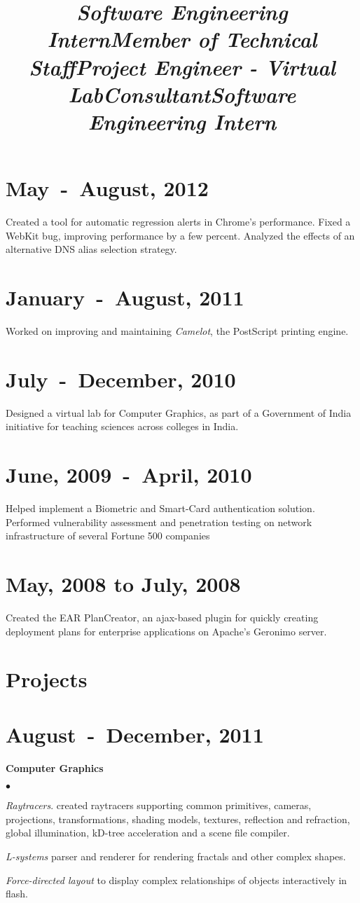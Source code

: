\documentclass[margin,line]{res}
\newcommand{\datesection}[1]{\section{\textnormal{\scriptsize \textcolor{subtle}{#1}}}}
\newenvironment{list2}{
  \begin{list}{$\bullet$}{%
      \setlength{\itemsep}{0in}
      \setlength{\parsep}{0in} \setlength{\parskip}{0in}
      \setlength{\topsep}{0in} \setlength{\partopsep}{0in} 
      \setlength{\leftmargin}{0.2in}}}{\end{list}}
\begin{document}
\begin{resume}
\datesection{May~-~August, 2012}
\title{\em Software Engineering Intern}
\begin{position}
Created a tool for automatic regression alerts in Chrome's performance.
Fixed a WebKit bug, improving performance by a few percent.
Analyzed the effects of an alternative DNS alias selection strategy.
\end{position}

\datesection{January~-~August, 2011}
\title{\em Member of Technical Staff}
\begin{position}
Worked on improving and maintaining \textit{Camelot}, the PostScript printing engine.
\end{position}

\datesection{July~-~December, 2010}
\title{\em Project Engineer - Virtual Lab}
\begin{position}
Designed a virtual lab for Computer Graphics, as part of a Government of India initiative for teaching sciences across colleges in India.
\end{position}

\datesection{June, 2009~-~April, 2010}
\title{\em Consultant}
\begin{position}
Helped implement a Biometric and Smart-Card authentication solution. \\
Performed vulnerability assessment and penetration testing on network infrastructure of several Fortune 500 companies
\end{position}

\datesection{May, 2008 to July, 2008}
\title{\em Software Engineering Intern}
\begin{position}
Created the EAR PlanCreator, an ajax-based plugin for quickly creating deployment plans for enterprise applications on Apache's Geronimo server.
\end{position}

\section{\sc Projects}
\datesection{August~-~December, 2011}
{\bf Computer Graphics}
\begin{list2}
\item {\em Raytracers}. created raytracers supporting common primitives, cameras, projections, transformations,
shading models, textures, reflection and refraction, global illumination, kD-tree acceleration and a scene file compiler.
\item {\em L-systems} parser and renderer for rendering fractals and other complex shapes.
\item {\em Force-directed layout} to display complex relationships of objects interactively in flash.
\end{list2}


\end{resume}
\end{document}
